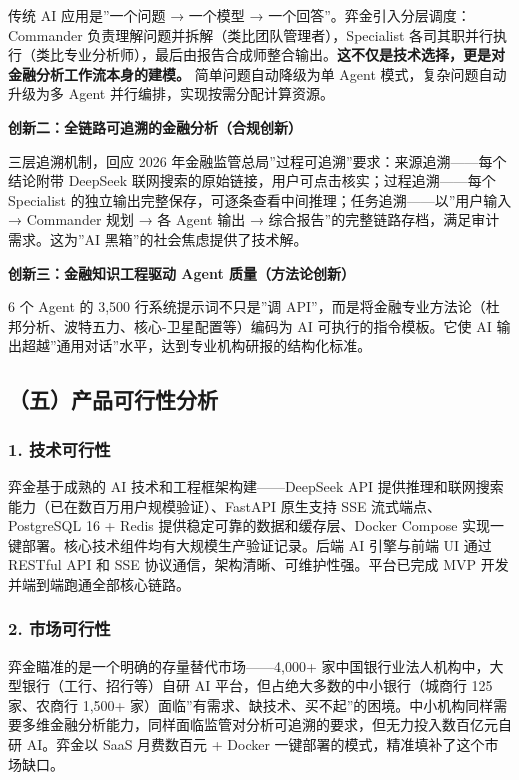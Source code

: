 \documentclass[
]{ctexart}
\begin{document}
传统 AI 应用是''一个问题 → 一个模型 →
一个回答''。弈金引入分层调度：Commander
负责理解问题并拆解（类比团队管理者），Specialist
各司其职并行执行（类比专业分析师），最后由报告合成师整合输出。\textbf{这不仅是技术选择，更是对金融分析工作流本身的建模。}
简单问题自动降级为单 Agent 模式，复杂问题自动升级为多 Agent
并行编排，实现按需分配计算资源。

\textbf{创新二：全链路可追溯的金融分析（合规创新）}

三层追溯机制，回应 2026
年金融监管总局''过程可追溯''要求：来源追溯------每个结论附带 DeepSeek
联网搜索的原始链接，用户可点击核实；过程追溯------每个 Specialist
的独立输出完整保存，可逐条查看中间推理；任务追溯------以''用户输入 →
Commander 规划 → 各 Agent 输出 →
综合报告''的完整链路存档，满足审计需求。这为''AI
黑箱''的社会焦虑提供了技术解。

\textbf{创新三：金融知识工程驱动 Agent 质量（方法论创新）}

6 个 Agent 的 3,500 行系统提示词不只是''调
API''，而是将金融专业方法论（杜邦分析、波特五力、核心-卫星配置等）编码为
AI 可执行的指令模板。它使 AI
输出超越''通用对话''水平，达到专业机构研报的结构化标准。

\subsection{（五）产品可行性分析}\label{ux4e94ux4ea7ux54c1ux53efux884cux6027ux5206ux6790}

\subsubsection{1. 技术可行性}\label{ux6280ux672fux53efux884cux6027}

弈金基于成熟的 AI 技术和工程框架构建------DeepSeek API
提供推理和联网搜索能力（已在数百万用户规模验证）、FastAPI 原生支持 SSE
流式端点、PostgreSQL 16 + Redis 提供稳定可靠的数据和缓存层、Docker
Compose 实现一键部署。核心技术组件均有大规模生产验证记录。后端 AI
引擎与前端 UI 通过 RESTful API 和 SSE
协议通信，架构清晰、可维护性强。平台已完成 MVP
开发并端到端跑通全部核心链路。

\subsubsection{2. 市场可行性}\label{ux5e02ux573aux53efux884cux6027}

弈金瞄准的是一个明确的存量替代市场------4,000+
家中国银行业法人机构中，大型银行（工行、招行等）自研 AI
平台，但占绝大多数的中小银行（城商行 125 家、农商行 1,500+
家）面临''有需求、缺技术、买不起''的困境。中小机构同样需要多维金融分析能力，同样面临监管对分析可追溯的要求，但无力投入数百亿元自研
AI。弈金以 SaaS 月费数百元 + Docker
一键部署的模式，精准填补了这个市场缺口。
\end{document}
